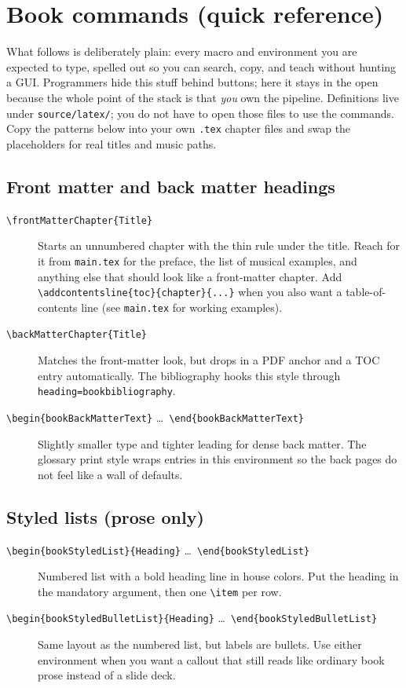 \section{Book commands (quick reference)}
\label{sec:book-commands}

What follows is deliberately plain: every macro and environment you are expected to type, spelled out so you can search, copy, and teach without hunting a GUI. Programmers hide this stuff behind buttons; here it stays in the open because the whole point of the stack is that \emph{you} own the pipeline. Definitions live under \verb|source/latex/|; you do not have to open those files to use the commands. Copy the patterns below into your own \verb|.tex| chapter files and swap the placeholders for real titles and music paths.

\subsection*{Front matter and back matter headings}

\begin{description}
  \item[\texttt{\textbackslash frontMatterChapter\{Title\}}]
  Starts an unnumbered chapter with the thin rule under the title. Reach for it from \verb|main.tex| for the preface, the list of musical examples, and anything else that should look like a front-matter chapter. Add \verb|\addcontentsline{toc}{chapter}{...}| when you also want a table-of-contents line (see \verb|main.tex| for working examples).
  \item[\texttt{\textbackslash backMatterChapter\{Title\}}]
  Matches the front-matter look, but drops in a PDF anchor and a TOC entry automatically. The bibliography hooks this style through \verb|heading=bookbibliography|.
  \item[\texttt{\textbackslash begin\{bookBackMatterText\}} \ldots\ \texttt{\textbackslash end\{bookBackMatterText\}}]
  Slightly smaller type and tighter leading for dense back matter. The glossary print style wraps entries in this environment so the back pages do not feel like a wall of defaults.
\end{description}

\subsection*{Styled lists (prose only)}

\begin{description}
  \item[\texttt{\textbackslash begin\{bookStyledList\}\{Heading\}} \ldots\ \texttt{\textbackslash end\{bookStyledList\}}]
  Numbered list with a bold heading line in house colors. Put the heading in the mandatory argument, then one \verb|\item| per row.
  \item[\texttt{\textbackslash begin\{bookStyledBulletList\}\{Heading\}} \ldots\ \texttt{\textbackslash end\{bookStyledBulletList\}}]
  Same layout as the numbered list, but labels are bullets. Use either environment when you want a callout that still reads like ordinary book prose instead of a slide deck.
\end{description}

